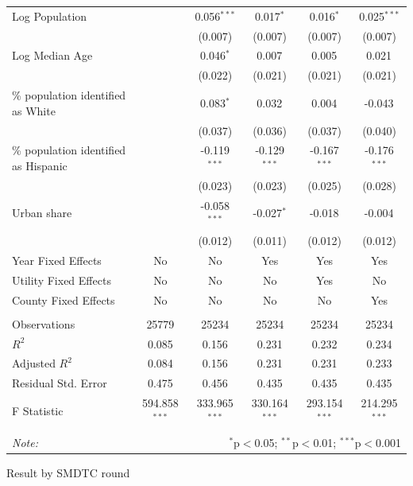 \documentclass[12pt,twoside,letterpaper]{article}
\begin{document}
\begin{table}[!htbp]
{\begin{tabular}{@{\extracolsep{5pt}}lccccc}
 Log Population & & 0.056$^{***}$ & 0.017$^{*}$ & 0.016$^{*}$ & 0.025$^{***}$ \\
& & (0.007) & (0.007) & (0.007) & (0.007) \\
 Log Median Age & & 0.046$^{*}$ & 0.007$^{}$ & 0.005$^{}$ & 0.021$^{}$ \\
& & (0.022) & (0.021) & (0.021) & (0.021) \\
 \% population identified as White & & 0.083$^{*}$ & 0.032$^{}$ & 0.004$^{}$ & -0.043$^{}$ \\
& & (0.037) & (0.036) & (0.037) & (0.040) \\
 \% population identified as Hispanic & & -0.119$^{***}$ & -0.129$^{***}$ & -0.167$^{***}$ & -0.176$^{***}$ \\
& & (0.023) & (0.023) & (0.025) & (0.028) \\
 Urban share & & -0.058$^{***}$ & -0.027$^{*}$ & -0.018$^{}$ & -0.004$^{}$ \\
& & (0.012) & (0.011) & (0.012) & (0.012) \\
 Year Fixed Effects & No & No & Yes & Yes & Yes \\
 Utility Fixed Effects & No & No & No & Yes & No \\
 County Fixed Effects & No & No & No & No & Yes \\
\hline \\[-1.8ex]
 Observations & 25779 & 25234 & 25234 & 25234 & 25234 \\
 $R^2$ & 0.085 & 0.156 & 0.231 & 0.232 & 0.234 \\
 Adjusted $R^2$ & 0.084 & 0.156 & 0.231 & 0.231 & 0.233 \\
 Residual Std. Error & 0.475 & 0.456 & 0.435 & 0.435 & 0.435 \\
 F Statistic & 594.858$^{***}$ & 333.965$^{***}$ & 330.164$^{***}$ & 293.154$^{***}$ & 214.295$^{***}$ \\
\hline
\hline \\[-1.8ex]
\textit{Note:} & \multicolumn{5}{r}{$^{*}$p$<$0.05; $^{**}$p$<$0.01; $^{***}$p$<$0.001} \\
\end{tabular}
}
\end{table}

Result by SMDTC round
\end{document}
